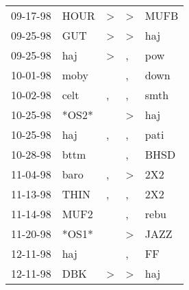 \begin{supertabular}{p{0.07\textwidth}p{0.06\textwidth}p{0.02\textwidth}p{0.02\textwidth}p{0.06\textwidth}}
          09-17-98\textsuperscript{} &           HOUR\textsuperscript{} &     \textgreater &     \textgreater &           MUFB\textsuperscript{} \\
          09-25-98\textsuperscript{} &            GUT\textsuperscript{} &     \textgreater &     \textgreater &            haj\textsuperscript{} \\
          09-25-98\textsuperscript{} &            haj\textsuperscript{} &     \textgreater &                , &            pow\textsuperscript{} \\
          10-01-98\textsuperscript{} &           moby\textsuperscript{} &                  &                , &           down\textsuperscript{} \\
          10-02-98\textsuperscript{} &           celt\textsuperscript{} &                , &                , &           smth\textsuperscript{} \\
          10-25-98\textsuperscript{} &                            *OS2* &                  &     \textgreater &            haj\textsuperscript{} \\
          10-25-98\textsuperscript{} &            haj\textsuperscript{} &                , &                , &           pati\textsuperscript{} \\
          10-28-98\textsuperscript{} &           bttm\textsuperscript{} &                  &                , &           BHSD\textsuperscript{} \\
          11-04-98\textsuperscript{} &           baro\textsuperscript{} &                , &     \textgreater &            2X2\textsuperscript{} \\
          11-13-98\textsuperscript{} &           THIN\textsuperscript{} &                , &                , &            2X2\textsuperscript{} \\
          11-14-98\textsuperscript{} &           MUF2\textsuperscript{} &                  &                , &           rebu\textsuperscript{} \\
          11-20-98\textsuperscript{} &                            *OS1* &                  &     \textgreater &           JAZZ\textsuperscript{} \\
          12-11-98\textsuperscript{} &            haj\textsuperscript{} &                  &                , &             FF\textsuperscript{} \\
          12-11-98\textsuperscript{} &            DBK\textsuperscript{} &     \textgreater &     \textgreater &            haj\textsuperscript{} \\

\end{supertabular}
